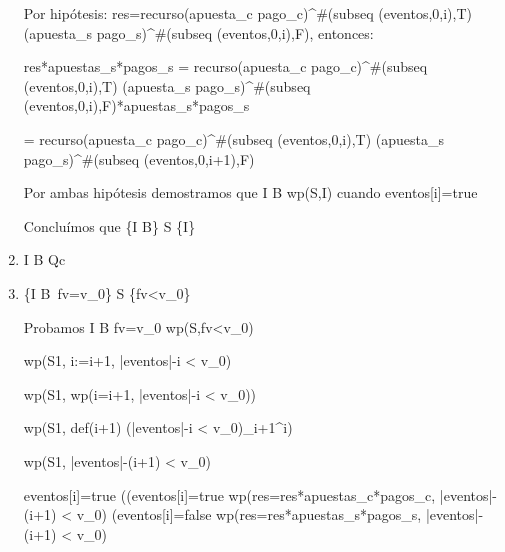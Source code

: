 \documentclass[10pt,a4paper]{article}
\begin{document}
\begin{enumerate}
    Por hipótesis: res=recurso(apuesta_c pago_c)^{\#(subseq (eventos,0,i),T)} (apuesta_s pago_s)^{\#(subseq (eventos,0,i),F)}, \hspace{3} entonces: 
    \vspace{2mm}

    res*apuestas_s*pagos_s = recurso(apuesta_c pago_c)^{\#(subseq (eventos,0,i),T)} (apuesta_s pago_s)^{\#(subseq (eventos,0,i),F)}*apuestas_s*pagos_s
    \vspace{2mm}

    = recurso(apuesta_c pago_c)^{\#(subseq (eventos,0,i),T)} (apuesta_s pago_s)^{\#(subseq (eventos,0,i+1),F)}
    \vspace{2mm}

    Por ambas hipótesis demostramos que I \wedge B \implica wp(S,I) \hspace{3} cuando \hspace{3} eventos[i]=true
    \vspace{2mm}

    Concluímos que {\{I \wedge B\} S \{I\}}
    \vspace{2mm}

    \item I \wedge \neg B \implica Qc
    
    \item {\{I \wedge B\ \wedge fv=v_0\} \hspace{2} S \hspace{2} \{fv<v_0\}}
    \vspace{2mm}

    Probamos I \wedge B \wedge fv=v_0 \implica wp(S,fv<v_0)
    \vspace{2mm}

    wp(S1, i:=i+1, |eventos|-i < v_0)
    \vspace{2mm}

    \equiv wp(S1, wp(i=i+1, |eventos|-i < v_0))
    \vspace{2mm}

    \equiv wp(S1, def(i+1) \yLuego (|eventos|-i < v_0)_{i+1}^i)
    \vspace{2mm}

    \equiv wp(S1, |eventos|-(i+1) < v_0)
    \vspace{2mm}

    \equiv eventos[i]=true \yLuego ((eventos[i]=true \wedge wp(res=res*apuestas_c*pagos_c, |eventos|-(i+1) < v_0) \vee (eventos[i]=false \wedge wp(res=res*apuestas_s*pagos_s, |eventos|-(i+1) < v_0)
    \vspace{2mm}


\end{enumerate}
\end{document}
